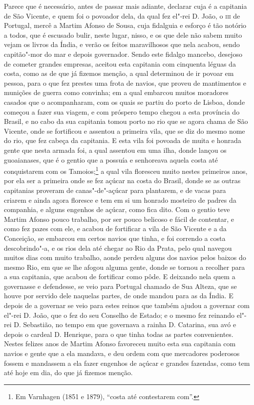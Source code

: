 Parece que é necessário, antes de passar mais adiante, declarar cuja é a capitania de São
Vicente, e quem foi o povoador dela, da qual fez el"-rei D. João, o \textsc{iii} de
Portugal, mercê a Martim Afonso de Sousa, cuja fidalguia e esforço é tão notório a todos,
que é escusado bulir, neste lugar, nisso, e os que dele não sabem muito vejam os livros da
Índia, e verão os feitos maravilhosos que nela acabou, sendo capitão"-mor do mar e depois
governador. Sendo este fidalgo mancebo, desejoso de cometer grandes empresas, aceitou esta
capitania com cinquenta léguas da costa, como as de que já fizemos menção, a qual
determinou de ir povoar em pessoa, para o que fez prestes uma frota de navios, que proveu
de mantimentos e munições de guerra como convinha; em a qual embarcou muitos moradores
casados que o acompanharam, com os quais se partiu do porto de Lisboa, donde começou a
fazer sua viagem, e com próspero tempo chegou a esta província do Brasil, e no cabo da sua
capitania tomou porto no rio que se agora chama de São Vicente, onde se fortificou e
assentou a primeira vila, que se diz do mesmo nome do rio, que fez cabeça da capitania. E
esta vila foi povoada de muita e honrada gente que nesta armada foi, a qual assentou em
uma ilha, donde lançou os guoaianases, que é o gentio que a possuía e senhoreava aquela
costa até conquistarem com os Tamoios;\footnote{ Em Varnhagen (1851 e 1879), ``costa até
contestarem com''.} a qual vila floresceu muito nestes primeiros anos, por ela ser a
primeira onde se fez açúcar na costa do Brasil, donde se as outras capitanias proveram de
canas"-de"-açúcar para plantarem, e de vacas para criarem e ainda agora floresce e tem em si
um honrado mosteiro de padres da companhia, e alguns engenhos de açúcar, como fica dito.
Com o gentio teve Martim Afonso pouco trabalho, por ser pouco belicoso e fácil de
contentar, e como fez pazes com ele, e acabou de fortificar a vila de São Vicente e a da
Conceição, se embarcou em certos navios que tinha, e foi correndo a costa descobrindo"-a, e
os rios dela até chegar ao Rio da Prata, pelo qual navegou muitos dias com muito trabalho,
aonde perdeu alguns dos navios pelos baixos do mesmo Rio, em que se lhe afogou alguma
gente, donde se tornou a recolher para a sua capitania, que acabou de fortificar como
pôde. E deixando nela quem a governasse e defendesse, se veio para Portugal chamado de Sua
Alteza, que se houve por servido dele naquelas partes, de onde mandou para as da Índia. E
depois de a governar se veio para estes reinos que também ajudou a governar com el"-rei D.
João, que o fez do seu Conselho de Estado; e o mesmo fez reinando el"-rei D. Sebastião, no
tempo em que governava a rainha D. Catarina, sua avó e depois o cardeal D. Henrique, para
o que tinha todas as partes convenientes. Nestes felizes anos de Martim Afonso favoreceu
muito esta sua capitania com navios e gente que a ela mandava, e deu ordem com que
mercadores poderosos fossem e mandassem a ela fazer engenhos de açúcar e grandes fazendas,
como tem até hoje em dia, do que já fizemos menção.

